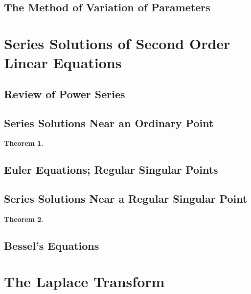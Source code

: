 \documentclass[10pt]{report}
\newtheorem{thm3}{Theorem}[subsection]
\begin{document}
\subsection{The Method of Variation of Parameters}
\section{Series Solutions of Second Order Linear Equations}
\subsection{Review of Power Series}
\subsection{Series Solutions Near an Ordinary Point}
\begin{thm3}
\end{thm3}
\subsection{Euler Equations; Regular Singular Points}
\subsection{Series Solutions Near a Regular Singular Point}
\begin{thm3}
\end{thm3}
\subsection{Bessel's Equations}
\section{The Laplace Transform}
\end{document}
